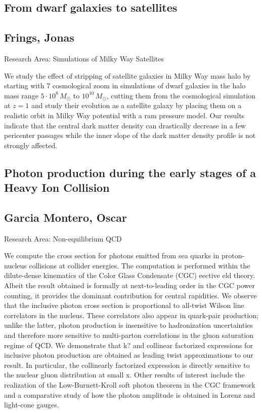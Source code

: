 \subsection*{\centering \large From dwarf galaxies to satellites}
\subsection*{\centering \normalsize Frings, Jonas}
Research Area: Simulations of Milky Way Satellites \newline

\noindent We study the effect of stripping of satellite galaxies in Milky Way mass halo by starting with 7 cosmological zoom in simulations of dwarf galaxies in the halo mass range $5\cdot10^8\,M_\odot$ to $10^10\,M_\odot$, cutting them from the cosmological simulation at $z=1$ and study their evolution as a satellite galaxy by placing them on a realistic orbit in Milky Way potential with a ram pressure model. Our results indicate that the central dark matter density can drastically decrease in a few pericenter passages while the inner slope of the dark matter density profile is not strongly affected.

\newpage
\subsection*{\centering \large Photon production during the early stages of a Heavy Ion Collision}
\subsection*{\centering \normalsize Garcia Montero, Oscar}
Research Area: Non-equilibrium QCD\newline

\noindent We compute the cross section for photons emitted from sea quarks in proton-nucleus collisions at collider energies. The computation is performed within the dilute-dense kinematics of the Color Glass Condensate (CGC) eective eld theory. Albeit the result obtained is formally at next-to-leading order in the CGC power counting, it provides the dominant contribution for central rapidities. We observe that the inclusive photon cross section is proportional to all-twist Wilson line correlators in the nucleus. These correlators also appear in quark-pair production; unlike the latter, photon production is insensitive to hadronization uncertainties and therefore more sensitive to multi-parton correlations in the gluon saturation regime of QCD. We demonstrate that k? and collinear factorized expressions for inclusive photon production are obtained as leading twist approximations to our result. In particular, the collinearly factorized expression is directly sensitive to the nuclear gluon distribution at small x. Other results of interest include the realization of the Low-Burnett-Kroll soft photon theorem in the CGC framework and a comparative study of how the photon amplitude is obtained in Lorenz and light-cone gauges.

